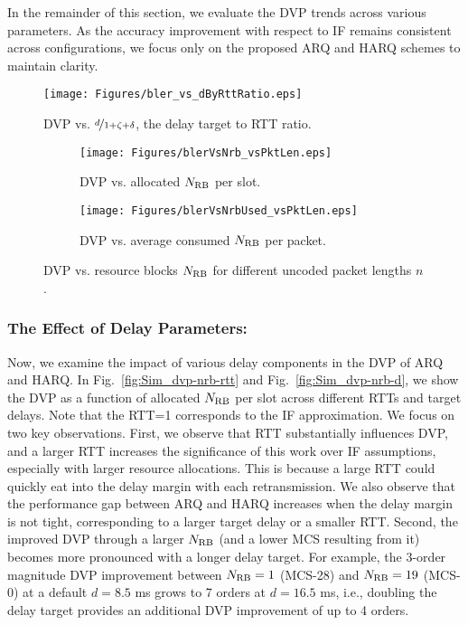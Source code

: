 In the remainder of this section, we evaluate the DVP trends across various parameters. As the accuracy improvement with respect to IF remains consistent across configurations, we focus only on the proposed ARQ and HARQ schemes to maintain clarity.
\begin{figure}[t]
\centering
\texttt{[image: Figures/bler\_vs\_dByRttRatio.eps]}
\caption{DVP vs. $\nicefrac{d}{1+{\zeta}+\delta}$, the delay target to RTT ratio.}
\label{fig:Sim_dvp-dByRtt}
\end{figure}

\begin{figure*}[t]
\centering
\begin{subfigure}[t]{0.49\textwidth}
\centering
\texttt{[image: Figures/blerVsNrb\_vsPktLen.eps]}
\caption{DVP vs. allocated $N_{\mathrm{RB}}$ per slot.}
\label{fig:Sim_dvp-nrb-n}
\end{subfigure}
\begin{subfigure}[t]{0.49\textwidth}
\centering
\texttt{[image: Figures/blerVsNrbUsed\_vsPktLen.eps]}
\caption{DVP vs. average consumed $N_{\mathrm{RB}}$ per packet.}
\label{fig:Sim_dvp-nrbUsed-n}
\end{subfigure}
\caption{DVP vs. resource blocks $N_{\mathrm{RB}}$ for different uncoded packet lengths $n$.}
\label{fig:Sim_dvp-nrb-nAndUsedn}
\end{figure*}

\subsubsection*{The Effect of Delay Parameters:}
Now, we examine the impact of various delay components in the DVP of ARQ and HARQ.
In Fig.~\ref{fig:Sim_dvp-nrb-rtt} and Fig.~\ref{fig:Sim_dvp-nrb-d}, we show the DVP as a function of allocated $N_{\mathrm{RB}}$ per slot across different RTTs and target delays.
Note that the RTT=1 corresponds to the IF approximation. 
We focus on two key observations. 
First, we observe that RTT substantially influences DVP, and a larger RTT increases the significance of this work over IF assumptions, especially with larger resource allocations.
This is because a large RTT could quickly eat into the delay margin with each retransmission. We also observe that the performance gap between ARQ and HARQ increases when the delay margin is not tight, corresponding to a larger target delay or a smaller RTT.
Second, the improved DVP through a larger $N_{\mathrm{RB}}$ (and a lower MCS resulting from it) becomes more pronounced with a longer delay target. 
For example, the 3-order magnitude DVP improvement between $N_{\mathrm{RB}}=1$ (MCS-28) and $N_{\mathrm{RB}}=19$ (MCS-0) at a default $d=8.5$ ms grows to 7 orders at $d=16.5$ ms, i.e., doubling the delay target provides an additional DVP improvement of up to 4 orders.

